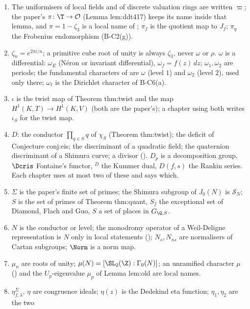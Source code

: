 \begin{convention}\label{conv:notation:bc15}
\leavevmode
\begin{enumerate}[label=(\alph*)]
\item The uniformisers of local fields and of discrete valuation rings are written $\varpi$; the paper's $\pi\colon\T\to\mathcal O$ (Lemma lem:ddt417) keeps its name inside that lemma,
and $\pi=1-\zeta_3$ is a local name of ; $\pi_f$ is the quotient map to $J_f$; $\pi_q$ the
Frobenius endomorphism (B-C2(g)).
\item $\zeta_n=e^{2\pi i/n}$; a primitive cube root of unity is always $\zeta_3$, never $\omega$ or $\rho$. $\omega$ is a differential:
$\omega_E$ (N\'eron or invariant differential), $\omega_f=f(z)\,dz$; $\omega_1,\omega_2$ are periods; the fundamental characters of
 are $\omega$ (level $1$) and $\omega_2$ (level $2$), used only there; $\omega_\ell$ is the Dirichlet
character of B-C6(a).
\item $\iota$ is the twist map of Theorem thm:twist and the map $H^1(K,T)\to H^1(K,V)$ (both are the paper's); a chapter using
both writes $\iota_S$ for the twist map.
\item $D$: the conductor $\prod_{q\in S}q$ of $\chi_S$ (Theorem thm:twist); the deficit of Conjecture conj:eis; the discriminant of a
quadratic field; the quaternion discriminant of a Shimura curve; a divisor (). $D_p$ is a decomposition group,
$\Dcris$ Fontaine's functor, ${}^D$ the Kummer dual, $D(f,s)$ the Rankin series. Each chapter uses at most two of these and says
which.
\item $\Sigma$ is the paper's finite set of primes; the Shimura subgroup of $J_0(N)$ is $\mathcal S_N$; $S$ is the set of primes of
Theorem thm:quant, $S_f$ the exceptional set of Diamond, Flach and Guo, $S$ a set of places in $G_{\Q,S}$.
\item $N$ is the conductor or level; the monodromy operator of a Weil-Deligne representation is $N$ only in local statements
(); $N_s,N_{ns}$ are normalisers of Cartan subgroups; $\Norm$ is a norm map.
\item $\mu_n$ are roots of unity; $\mu(N)=[\SL_2(\Z):\Gamma_0(N)]$; an unramified character $\mu$ () and the
$U_p$-eigenvalue $\mu_p$ of Lemma lem:old are local names.
\item $\eta^\Sigma_{f,\lambda}$, $\eta$ are congruence ideals; $\eta(z)$ is the Dedekind eta function; $\eta_1,\eta_2$ are the two

\end{enumerate}
\end{convention}
